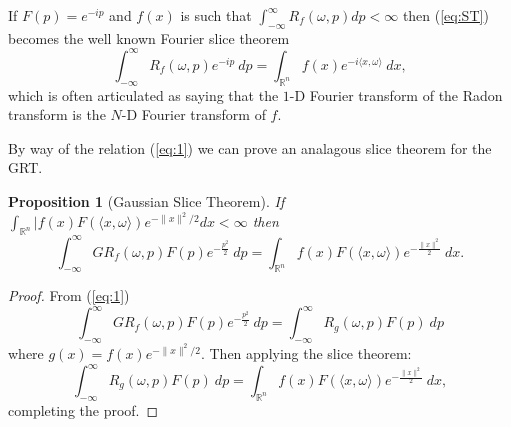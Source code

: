\documentclass{amsart}
\newtheorem{proposition}[theorem]{Proposition}
\theoremstyle{remark}
\newtheorem{remark}[theorem]{Remark}
\numberwithin{equation}{section}
\newcommand{\tc}{\textcolor{blue}}
\newcommand{\RR}{\mathbb{R}}
\begin{document}

If $F(p) = e^{-ip}$ and $f(x)$ is such that $\int_{-\infty}^\infty R_f(\omega, p) dp < \infty$ then (\ref{eq:ST}) becomes the well known Fourier slice theorem
\[
    \int_{-\infty}^\infty R_f(\omega, p) e^{-ip} ~dp
    = \int_{\mathbb{R}^n} f(x) e^{-i\langle x, \omega\rangle} ~dx,
\]
which is often articulated as saying that the $1$-D Fourier transform of the Radon transform is the $N$-D Fourier transform of $f$.

By way of the relation (\ref{eq:1}) we can prove an analagous slice theorem for the GRT. 
\begin{proposition}[Gaussian Slice Theorem] If $\int_{\mathbb{R}^n} |f(x) F(\langle x, \omega\rangle) e^{-\|x\|^2/2}dx < \infty$ then
\begin{equation}\label{eq:GST}
    \int_{-\infty}^\infty GR_f(\omega, p)F(p) e^{-\frac{p^2} 2} ~dp
    = \int_{\mathbb{R}^n}f(x) F(\langle x, \omega\rangle) e^{-\frac{\|x\|^2} 2} ~dx. 
\end{equation}
\end{proposition}
\begin{proof}
From (\ref{eq:1})
\[
    \int_{-\infty}^\infty GR_f(\omega, p)F(p) e^{-\frac{p^2} 2} ~dp 
    = \int_{-\infty}^\infty R_g(\omega, p) F(p) ~dp
\]
where $g(x) = f(x)e^{-\|x\|^2/2}$. Then applying the slice theorem:
\[
    \int_{-\infty}^\infty R_g(\omega, p) F(p) ~dp 
    = \int_{\RR^n} f(x)F(\langle x, \omega \rangle) e^{-\frac{\|x\|^2} 2} ~dx,
\]
completing the proof.
\end{proof}

\end{document}
